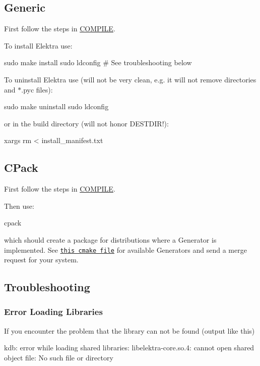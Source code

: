 \subsection*{Generic}

First follow the steps in \hyperlink{doc_COMPILE_md}{C\+O\+M\+P\+I\+LE}.

To install Elektra use\+: \begin{DoxyVerb}    sudo make install
    sudo ldconfig  # See troubleshooting below
\end{DoxyVerb}


To uninstall Elektra use (will not be very clean, e.\+g. it will not remove directories and {\ttfamily $\ast$.pyc} files)\+: \begin{DoxyVerb}    sudo make uninstall
    sudo ldconfig
\end{DoxyVerb}


or in the build directory (will not honor D\+E\+S\+T\+D\+I\+R!)\+: \begin{DoxyVerb}    xargs rm < install_manifest.txt
\end{DoxyVerb}


\subsection*{C\+Pack}

First follow the steps in \hyperlink{doc_COMPILE_md}{C\+O\+M\+P\+I\+LE}.

Then use\+: \begin{DoxyVerb}    cpack
\end{DoxyVerb}


which should create a package for distributions where a Generator is implemented. See \href{/home/markus/Projekte/Elektra/current/cmake/ElektraPackaging.cmake}{\tt this cmake file} for available Generators and send a merge request for your system.

\subsection*{Troubleshooting}

\subsubsection*{Error Loading Libraries}

If you encounter the problem that the library can not be found (output like this) \begin{DoxyVerb}    kdb: error while loading shared libraries:
         libelektra-core.so.4: cannot open shared object file: No such file or directory
\end{DoxyVerb}


